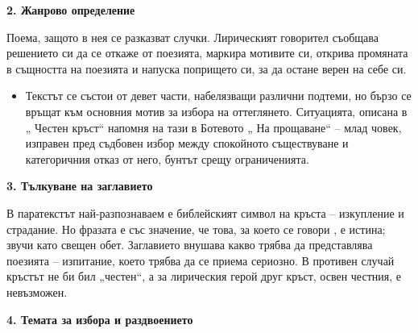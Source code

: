 \documentclass[12pt,a4paper]{article}
\begin{document}
\vspace{0.1cm}
\textbf{2. Жанрово определение}
\vspace{0.1cm}
 
\indent Поема, защото в нея се разказват случки. Лирическият говорител съобщава решението си да се откаже от поезията, маркира мотивите си, открива промяната в същността на поезията и напуска попрището си, за да остане верен на себе си. 

\begin{itemize}[leftmargin=*]
\vspace{-0.2cm}
\item Текстът се състои от девет части, набелязващи различни подтеми, но бързо се връщат към основния мотив за избора на оттеглянето.
Ситуацията, описана в „ Честен кръст“ напомня на тази в Ботевото „ На прощаване“ – млад човек, изправен пред съдбовен избор между спокойното съществуване и категоричния отказ от него, бунтът срещу  ограниченията.
\end{itemize}

\vspace{0.1cm}
\textbf{3. Тълкуване на заглавието}
\vspace{0.1cm}
 
\indent В паратекстът най-разпознаваем е библейският символ на кръста – изкупление и страдание. Но фразата е със значение, че това, за което се говори , е истина; звучи като свещен обет. Заглавието  внушава какво трябва 
да представлява поезията – изпитание, което трябва да се приема сериозно. В противен случай кръстът не би бил „честен“, а за лирическия герой друг кръст, освен честния, е невъзможен.

\vspace{0.1cm}
\textbf{4. Темата за избора и раздвоението}
\vspace{0.1cm}
\end{document}
